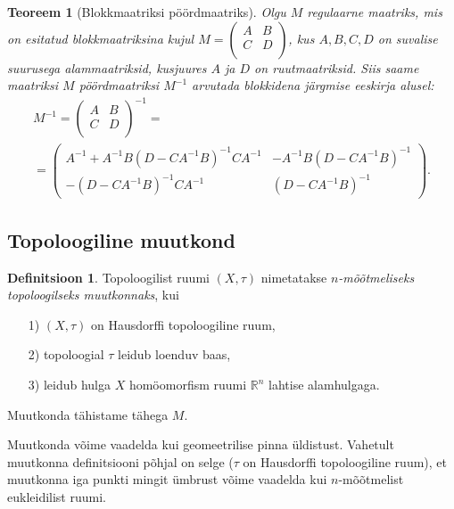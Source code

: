 \documentclass[a4paper,12pt]{article}
\theoremstyle{plain}
\newtheorem{teoreem}{Teoreem}[section]
\theoremstyle{definition}
\newtheorem{definitsioon}{Definitsioon}[section]
\numberwithin{equation}{section}
\begin{document}
\begin{teoreem}[Blokkmaatriksi pöördmaatriks]
Olgu $M$ regulaarne maatriks, mis on esitatud blokkmaatriksina kujul $M = \begin{pmatrix} A & B \\ C & D \\ \end{pmatrix}$, kus $A, B, C, D$ on suvalise suurusega alammaatriksid, kusjuures $A$ ja $D$ on ruutmaatriksid. Siis saame maatriksi $M$ pöördmaatriksi $M^{-1}$ arvutada blokkidena järgmise eeskirja alusel:
\begin{align*}
M^{-1} = \begin{pmatrix}
A & B \\ C & D \\
\end{pmatrix}^{-1} = \qquad\qquad\qquad\qquad\qquad \\
= \begin{pmatrix}
A^{-1}+A^{-1}B\left(D-CA^{-1}B\right)^{-1}CA^{-1} & -A^{-1}B\left(D-CA^{-1}B\right)^{-1} \\
-\left(D- CA^{-1}B\right)^{-1}CA^{-1} & \left(D-CA^{-1}B\right)^{-1}
\end{pmatrix}.
\end{align*}
\end{teoreem}

\subsection{Topoloogiline muutkond}

\begin{definitsioon}
Topoloogilist ruumi $\left(X, \tau\right)$ nimetatakse \emph{$n$-mõõtmeliseks topoloogilseks muutkonnaks}, kui
\begin{itemize}
\item[1)] $\left(X, \tau\right)$ on Hausdorffi topoloogiline ruum,
\item[2)] topoloogial $\tau$ leidub loenduv baas,
\item[3)] leidub hulga $X$ homöomorfism ruumi $\mathbb{R}^n$ lahtise alamhulgaga.
\end{itemize}
Muutkonda tähistame tähega $M$.
\end{definitsioon}

Muutkonda võime vaadelda kui geomeetrilise pinna üldistust. Vahetult muutkonna definitsiooni põhjal on selge ($\tau$ on Hausdorffi topoloogiline ruum), et muutkonna iga punkti mingit ümbrust võime vaadelda kui $n$-mõõtmelist eukleidilist ruumi.
\end{document}
